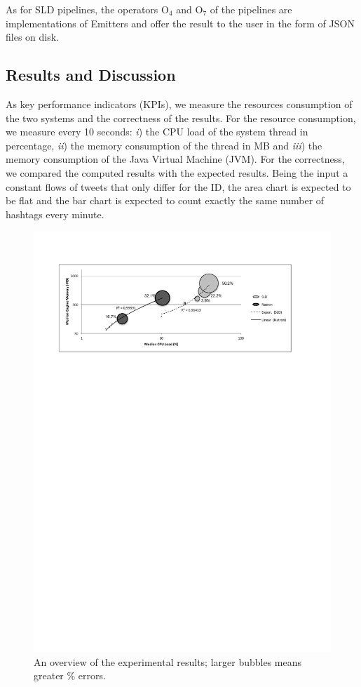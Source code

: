 {As for SLD pipelines, the operators O$_4$ and O$_7$ of the \sti{} pipelines are implementations of \textsf{Emitter}s and offer the result to the user in the form of JSON files on disk.

\subsection{Results and Discussion}\label{sec:comp-mod-eval-performace-res}
As key performance indicators (KPIs), we measure  the resources consumption of the two systems and the correctness of the results. For the resource consumption, we measure every 10 seconds: \textit{i}) the CPU load of the system thread in percentage, \textit{ii}) the memory consumption of the thread in MB and \textit{iii}) the memory consumption of the Java Virtual Machine (JVM). For the correctness, we compared the computed results with the expected results. Being the input a constant flows of tweets that only differ for the ID, the area chart is expected to be flat and the bar chart is expected to count exactly the same number of hashtags every minute.

\begin{figure}[t]
\centering
\includegraphics[width=\textwidth]{img/comp-mod-cpu-mem-acerror}
\caption{An overview of the experimental results; larger  bubbles means greater \% errors.}
\label{fig:cpu-mem}
\end{figure}

}
